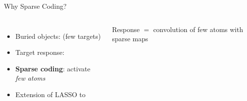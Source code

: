 \begin{frame}{Why Sparse Coding?}

  \begin{columns}[T]
      \vspace{0.3em}
      \begin{itemize}
        \setlength{\itemsep}{0.1em}
        \item Buried objects:  (few targets)
        \pause
        \item Target response: 
        \pause
        \item \textbf{Sparse coding}: activate \emph{few atoms}
        \pause
        \item Extension of LASSO to 
      \end{itemize}

      \vspace{0.4em}
      \begin{shibuiframe}{ }
        \small
        Response $=$ convolution of few atoms with sparse maps
      \end{shibuiframe}

      \vspace{0.3em}
      \centering
  \end{columns}
\end{frame}

